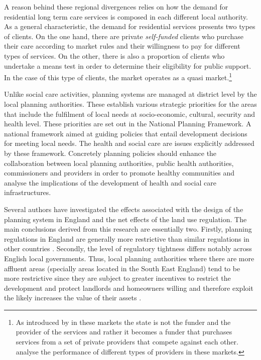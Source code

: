 \documentclass[12pt,letterpaper]{article}
\begin{document}
 A reason behind these regional divergences relies on how the demand for residential long term care services is
 composed in each different local authority. As a general characteristic, the 
 demand for residential services presents two types of clients. On the one hand, 
 there are private  \textit{self-funded} clients who purchase their care 
 according to market rules and their willingness to pay for different types of 
 services. On the other, there is also a proportion of clients who 
 undertake a means test in order to determine 
 their eligibility for public support. In the case of this type of clients, the market operates as a quasi 
 market.\footnote{As introduced by \citet{legrand1991quasi} in these markets the 
 state is not the funder and the provider of the services and rather it becomes 
 a funder that purchases services from a set of private providers that compete 
 against each other. \citet{barron2017quasi} analyse the performance of different types of providers in these markets.}

Unlike social care activities, planning systems are managed at district level by the local planning authorities. 
 These establish various strategic priorities for the areas that include the fulfilment of 
 local needs at socio-economic, 
  cultural, security and health level. These priorities are set out in the National Planning Framework. A national
  framework aimed at guiding policies that entail development decisions for meeting local needs. 
    The health and social care are issues explicitly addressed by these framework. Concretely planning policies should enhance the collaboration between local planning authorities, 
     public health authorities, commissioners and providers in order to promote healthy communities 
     and analyse the implications of the development of health and social care infrastructures. 
     
   Several authors have investigated the effects associated with the design of the planning system in England 
and the net effects of the land use regulation. The main conclusions derived from this research are essentially
 two. Firstly, planning regulations in England are generally more restrictive than similar regulations in other
  countries \citep{cheshire2009, hilber2015}. Secondly, the level of regulatory tightness differs notably across
 English local governments. Thus, local planning authorities
                 where there are more affluent areas (specially areas located in the South East England) 
                 tend to be more restrictive since they are subject to greater incentives to restrict 
                 the development and protect landlords and homeowners willing and therefore
                  exploit the likely increases the value of their assets \citep{hilber2016supply, 
                  hilber2015}. 
  
\end{document}
